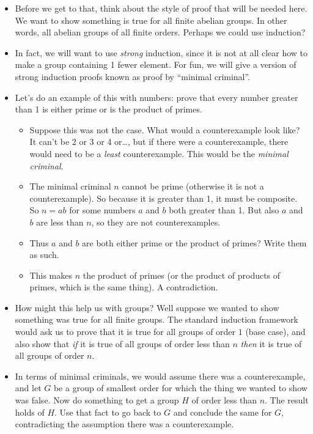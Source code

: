 \documentclass[12pt]{article}
\theoremstyle{plain}
\theoremstyle{definition}
\theoremstyle{remark}
\begin{document}
\begin{itemize}
\item Before we get to that, think about the style of proof that will be needed here.  We want to show something is true for all finite abelian groups.  In other words, all abelian groups of all finite orders.  Perhaps we could use induction?

\item In fact, we will want to use \emph{strong} induction, since it is not at all clear how to make a group containing 1 fewer element.  For fun, we will give a version of strong induction proofs known as proof by ``minimal criminal''.

\item Let's do an example of this with numbers: prove that every number greater than 1 is either prime or is the product of primes.

\begin{itemize}
  \item Suppose this was not the case.  What would a counterexample look like?  It can't be 2 or 3 or 4 or\ldots, but if there were a counterexample, there would need to be a \emph{least} counterexample.  This would be the \emph{minimal criminal}.
  
  \item The minimal criminal $n$ cannot be prime (otherwise it is not a counterexample).  So because it is greater than 1, it must be composite.  So $n = ab$ for some numbers $a$ and $b$ both greater than 1.  But also $a$ and $b$ are less than $n$, so they are not counterexamples.  
  \item Thus $a$ and $b$ are both either prime or the product of primes?  Write them as such.  
  \item This makes $n$ the product of primes (or the product of products of primes, which is the same thing).  A contradiction.
\end{itemize}

\item How might this help us with groups?  Well suppose we wanted to show something was true for all finite groups.  The standard induction framework would ask us to prove that it is true for all groups of order $1$ (base case), and also show that \emph{if} it is true of all groups of order less than $n$ \emph{then} it is true of all groups of order $n$.

\item In terms of minimal criminals, we would assume there was a counterexample, and let $G$ be a group of smallest order for which the thing we wanted to show was false.  Now do something to get a group $H$ of order less than $n$.  The result holds of $H$.  Use that fact to go back to $G$ and conclude the same for $G$, contradicting the assumption there was a counterexample.


\end{itemize}
\end{document}
